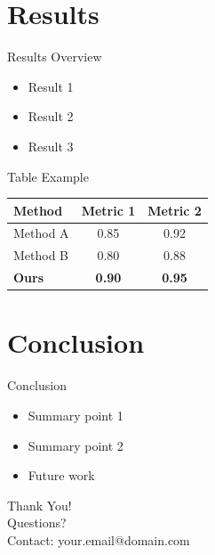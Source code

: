 \documentclass[aspectratio=169, dvipsnames, handout]{beamer}
\newcommand{\1}{\mathds{1}}	%
\begin{document}
\section{Results}

\begin{frame}{Results Overview}
    \begin{itemize}
        \item Result 1
        \item Result 2
        \item Result 3
    \end{itemize}
\end{frame}

\begin{frame}{Table Example}
    \centering
    \begin{tabular}{lcc}
        \toprule
        \textbf{Method} & \textbf{Metric 1} & \textbf{Metric 2} \\
        \midrule
        Method A & 0.85 & 0.92 \\
        Method B & 0.80 & 0.88 \\
        \textbf{Ours} & \textbf{0.90} & \textbf{0.95} \\
        \bottomrule
    \end{tabular}
\end{frame}

\section{Conclusion}

\begin{frame}{Conclusion}
    \begin{itemize}
        \item Summary point 1
        \item Summary point 2
        \item Future work
    \end{itemize}
\end{frame}

\begin{frame}[plain]
    \centering
    \vspace{1.5cm}
    {\Huge Thank You!}\\[1cm]
    {\Large Questions?}\\[1cm]
    {\small Contact: your.email@domain.com}
\end{frame}
\end{document}

